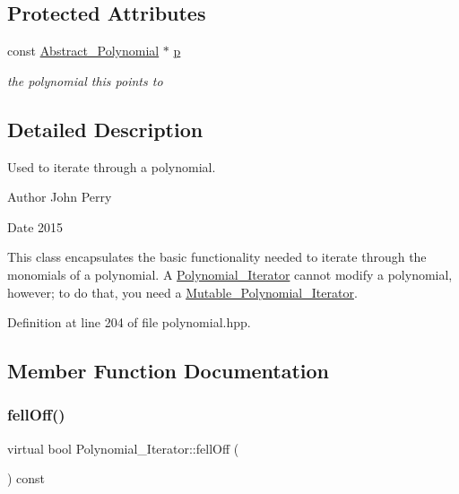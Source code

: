 \subsection*{Protected Attributes}
\begin{DoxyCompactItemize}
\item 
\mbox{\label{class_polynomial___iterator_ab35e9b9c4d7ed12dabce5057a4c2a1b5}} 
const \hyperlink{class_abstract___polynomial}{Abstract\+\_\+\+Polynomial} $\ast$ \hyperlink{class_polynomial___iterator_ab35e9b9c4d7ed12dabce5057a4c2a1b5}{p}
\begin{DoxyCompactList}\small\item\em the polynomial {\ttfamily this} points to \end{DoxyCompactList}\end{DoxyCompactItemize}


\subsection{Detailed Description}
Used to iterate through a polynomial. 

\begin{DoxyAuthor}{Author}
John Perry 
\end{DoxyAuthor}
\begin{DoxyDate}{Date}
2015
\end{DoxyDate}
This class encapsulates the basic functionality needed to iterate through the monomials of a polynomial. A \hyperlink{class_polynomial___iterator}{Polynomial\+\_\+\+Iterator} cannot modify a polynomial, however; to do that, you need a \hyperlink{class_mutable___polynomial___iterator}{Mutable\+\_\+\+Polynomial\+\_\+\+Iterator}. 

Definition at line 204 of file polynomial.\+hpp.



\subsection{Member Function Documentation}
\mbox{\label{class_polynomial___iterator_ac571e120134088d6067718bbad513e2d}} 
\subsubsection{\texorpdfstring{fell\+Off()}{fellOff()}}
{\footnotesize\ttfamily virtual bool Polynomial\+\_\+\+Iterator\+::fell\+Off (\begin{DoxyParamCaption}{ }\end{DoxyParamCaption}) const\hspace{0.3cm}{\ttfamily [pure virtual]}}



